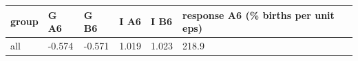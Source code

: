 \begingroup\small
\setlength{\tabcolsep}{3pt}
\renewcommand{\arraystretch}{1.04}
\begin{tabularx}{\linewidth}{XXXXXX}
\toprule
group & G A6 & G B6 & I A6 & I B6 & response A6 (\% births per unit eps) \\
\midrule
all & -0.574 & -0.571 & 1.019 & 1.023 & 218.9 \\
\bottomrule
\end{tabularx}
\endgroup
